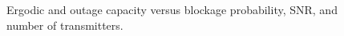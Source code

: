 \documentclass[10pt,journal,a4paper]{IEEEtran}
\begin{document}
\begin{figure}
\centerline{
\hfil
{}
\hfil
{}}
\vspace{-0.4cm}
\caption{Ergodic and outage capacity versus blockage probability, SNR, and number of transmitters.}
\label{fig:capacity}
\vspace{-0.3cm}
\end{figure}
\end{document}

